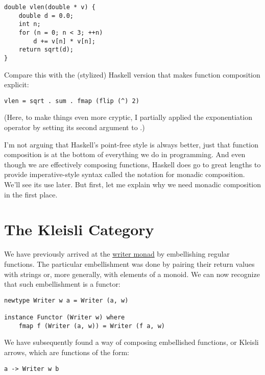 \begin{Verbatim}[commandchars=\\\{\}]
double vlen(double * v) {
    double d = 0.0;
    int n;
    for (n = 0; n < 3; ++n)
        d += v[n] * v[n];
    return sqrt(d);
}
\end{Verbatim}
Compare this with the (stylized) Haskell version that makes function
composition explicit:

\begin{Verbatim}[commandchars=\\\{\}]
vlen = sqrt . sum . fmap (flip (^) 2)
\end{Verbatim}
(Here, to make things even more cryptic, I partially applied the
exponentiation operator \code{(\^{})} by setting its second argument
to .)

I'm not arguing that Haskell's point-free style is always better, just
that function composition is at the bottom of everything we do in
programming. And even though we are effectively composing functions,
Haskell does go to great lengths to provide imperative-style syntax
called the  notation for monadic composition. We'll see its
use later. But first, let me explain why we need monadic composition in
the first place.

\section{The Kleisli Category}\label{the-kleisli-category}

We have previously arrived at the
\hyperref[kleisli-categories]{writer
monad} by embellishing regular functions. The particular embellishment
was done by pairing their return values with strings or, more generally,
with elements of a monoid. We can now recognize that such embellishment
is a functor:

\begin{Verbatim}[commandchars=\\\{\}]
newtype Writer w a = Writer (a, w)

instance Functor (Writer w) where
    fmap f (Writer (a, w)) = Writer (f a, w)
\end{Verbatim}
We have subsequently found a way of composing embellished functions, or
Kleisli arrows, which are functions of the form:

\begin{Verbatim}[commandchars=\\\{\}]
a -> Writer w b
\end{Verbatim}

